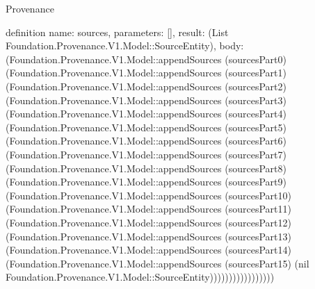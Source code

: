\begin{lexlean}{Provenance}
\begin{semanticmodule}
definition{
  name: sources,
  parameters: [],
  result: (List Foundation.Provenance.V1.Model::SourceEntity),
  body: (Foundation.Provenance.V1.Model::appendSources (sourcesPart0) (Foundation.Provenance.V1.Model::appendSources (sourcesPart1) (Foundation.Provenance.V1.Model::appendSources (sourcesPart2) (Foundation.Provenance.V1.Model::appendSources (sourcesPart3) (Foundation.Provenance.V1.Model::appendSources (sourcesPart4) (Foundation.Provenance.V1.Model::appendSources (sourcesPart5) (Foundation.Provenance.V1.Model::appendSources (sourcesPart6) (Foundation.Provenance.V1.Model::appendSources (sourcesPart7) (Foundation.Provenance.V1.Model::appendSources (sourcesPart8) (Foundation.Provenance.V1.Model::appendSources (sourcesPart9) (Foundation.Provenance.V1.Model::appendSources (sourcesPart10) (Foundation.Provenance.V1.Model::appendSources (sourcesPart11) (Foundation.Provenance.V1.Model::appendSources (sourcesPart12) (Foundation.Provenance.V1.Model::appendSources (sourcesPart13) (Foundation.Provenance.V1.Model::appendSources (sourcesPart14) (Foundation.Provenance.V1.Model::appendSources (sourcesPart15) (nil Foundation.Provenance.V1.Model::SourceEntity)))))))))))))))))
}


\end{semanticmodule}
\end{lexlean}
